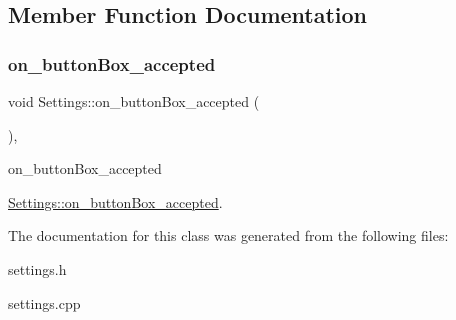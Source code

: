 \subsection{Member Function Documentation}
\mbox{\label{classSettings_a65022df92b08690beb9b28fe4885504c}} 
\subsubsection{\texorpdfstring{on\+\_\+button\+Box\+\_\+accepted}{on\_buttonBox\_accepted}}
{\footnotesize\ttfamily void Settings\+::on\+\_\+button\+Box\+\_\+accepted (\begin{DoxyParamCaption}{ }\end{DoxyParamCaption})\hspace{0.3cm}{\ttfamily [private]}, {\ttfamily [slot]}}



on\+\_\+button\+Box\+\_\+accepted 

\hyperlink{classSettings_a65022df92b08690beb9b28fe4885504c}{Settings\+::on\+\_\+button\+Box\+\_\+accepted}. 

The documentation for this class was generated from the following files\+:\begin{DoxyCompactItemize}
\item 
settings.\+h\item 
settings.\+cpp\end{DoxyCompactItemize}
